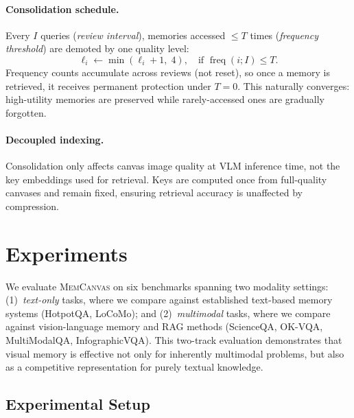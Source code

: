 \documentclass{article}
\newcommand{\memcanvas}{\textsc{MemCanvas}}
\begin{document}
\paragraph{Consolidation schedule.}
Every $I$ queries (\emph{review interval}), memories accessed $\leq T$ times (\emph{frequency threshold}) are demoted by one quality level:
\begin{equation}
  \ell_i \leftarrow \min(\ell_i + 1,\; 4), \quad \text{if } \operatorname{freq}(i; I) \leq T.
\end{equation}
Frequency counts accumulate across reviews (not reset), so once a memory is retrieved, it receives permanent protection under $T=0$. This naturally converges: high-utility memories are preserved while rarely-accessed ones are gradually forgotten.

\paragraph{Decoupled indexing.}
Consolidation only affects canvas image quality at VLM inference time, not the key embeddings used for retrieval. Keys are computed once from full-quality canvases and remain fixed, ensuring retrieval accuracy is unaffected by compression.

\section{Experiments}
\label{sec:experiments}

We evaluate \memcanvas{} on six benchmarks spanning two modality settings: (1)~\emph{text-only} tasks, where we compare against established text-based memory systems (HotpotQA, LoCoMo); and (2)~\emph{multimodal} tasks, where we compare against vision-language memory and RAG methods (ScienceQA, OK-VQA, MultiModalQA, InfographicVQA). This two-track evaluation demonstrates that visual memory is effective not only for inherently multimodal problems, but also as a competitive representation for purely textual knowledge.

\subsection{Experimental Setup}
\label{sec:setup}
\end{document}
